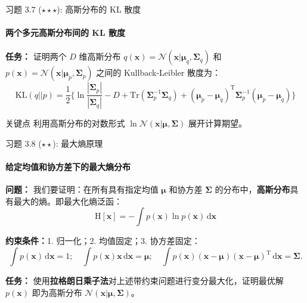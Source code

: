 \documentclass[12pt, aspectratio=169]{beamer}
\newcommand{\vect}[1]{\mathbf{#1}}
\newcommand{\N}{\mathcal{N}}
\newcommand{\KL}{\mathrm{KL}}
\newcommand{\Tr}{\mathrm{Tr}}
\newcommand{\Hent}{\mathrm{H}}
\begin{document}
\begin{frame}{习题 3.7 ($\star\star\star$): 高斯分布的 KL 散度}
    \framesubtitle{两个多元高斯分布间的 KL 散度}
    
    \textbf{任务：}
    证明两个 $D$ 维高斯分布 $q(\vect{x}) = \mathcal{N}(\vect{x}|\boldsymbol{\mu}_q, \boldsymbol{\Sigma}_q)$ 和 $p(\vect{x}) = \mathcal{N}(\vect{x}|\boldsymbol{\mu}_p, \boldsymbol{\Sigma}_p)$ 之间的 Kullback-Leibler 散度为：
    \begin{equation*}
        \KL(q||p) = \frac{1}{2} \bigg\{ 
        \ln \frac{|\boldsymbol{\Sigma}_p|}{|\boldsymbol{\Sigma}_q|} - D 
        + \Tr\left(\boldsymbol{\Sigma}_p^{-1}\boldsymbol{\Sigma}_q\right) 
        + (\boldsymbol{\mu}_p - \boldsymbol{\mu}_q)^\mathrm{T} \boldsymbol{\Sigma}_p^{-1} (\boldsymbol{\mu}_p - \boldsymbol{\mu}_q) 
        \bigg\}
    \end{equation*}
    
    \begin{alertblock}{关键点}
    利用高斯分布的对数形式 $\ln \N(\vect{x}|\boldsymbol{\mu}, \boldsymbol{\Sigma})$ 展开计算期望。
    \end{alertblock}
\end{frame}

\begin{frame}{习题 3.8 ($\star\star$): 最大熵原理}
    \framesubtitle{给定均值和协方差下的最大熵分布}
    
    \textbf{问题：}
    我们要证明：在所有具有指定均值 $\boldsymbol{\mu}$ 和协方差 $\boldsymbol{\Sigma}$ 的分布中，\textbf{高斯分布}具有最大的熵。即最大化熵泛函：
    \begin{equation*}
        \Hent[\vect{x}] = - \int p(\vect{x}) \ln p(\vect{x}) \,\mathrm{d}\vect{x}
    \end{equation*}
    
    \textbf{约束条件：}1. 归一化；2. 均值固定；3. 协方差固定：
    \begin{equation*}
        \int p(\vect{x}) \,\mathrm{d}\vect{x} = 1; \quad 
        \int p(\vect{x}) \vect{x} \,\mathrm{d}\vect{x} = \boldsymbol{\mu}; \quad 
        \int p(\vect{x}) (\vect{x}-\boldsymbol{\mu})(\vect{x}-\boldsymbol{\mu})^\mathrm{T} \,\mathrm{d}\vect{x} = \boldsymbol{\Sigma}. 
    \end{equation*}
    
    \textbf{任务：}
    使用\textbf{拉格朗日乘子法}对上述带约束问题进行变分最大化，证明最优解 $p(\vect{x})$ 即为高斯分布 $\N(\vect{x}|\boldsymbol{\mu},\boldsymbol{\Sigma})$。
\end{frame}
\end{document}
